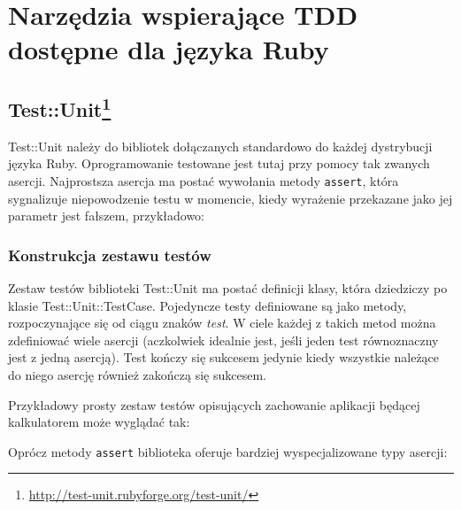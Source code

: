   \section{Narzędzia wspierające TDD dostępne dla języka Ruby}
    
    \subsection[Test::Unit]{Test::Unit\footnote{\url{http://test-unit.rubyforge.org/test-unit/}\nocite{test_unit}}}
    
    Test::Unit należy do bibliotek dołączanych standardowo do każdej dystrybucji języka Ruby. Oprogramowanie testowane jest tutaj przy pomocy tak zwanych asercji. Najprostsza asercja ma postać wywołania metody \texttt{assert}, która sygnalizuje niepowodzenie testu w momencie, kiedy wyrażenie przekazane jako jej parametr jest fałszem, przykładowo:
    
    
     
     \subsubsection{Konstrukcja zestawu testów}
     Zestaw testów biblioteki Test::Unit ma postać definicji klasy, która dziedziczy po klasie Test::Unit::TestCase. Pojedyncze testy definiowane są jako metody, rozpoczynające się od ciągu znaków \emph{test}. W ciele każdej z takich metod można zdefiniować wiele asercji (aczkolwiek idealnie jest, jeśli jeden test równoznaczny jest z jedną asercją). Test kończy się sukcesem jedynie kiedy wszystkie należące do niego asercję również zakończą się sukcesem.
     
     Przykładowy prosty zestaw testów opisujących zachowanie aplikacji będącej kalkulatorem może wyglądać tak:
     
     
     
     Oprócz metody \texttt{assert} biblioteka oferuje bardziej wyspecjalizowane typy asercji:
     
